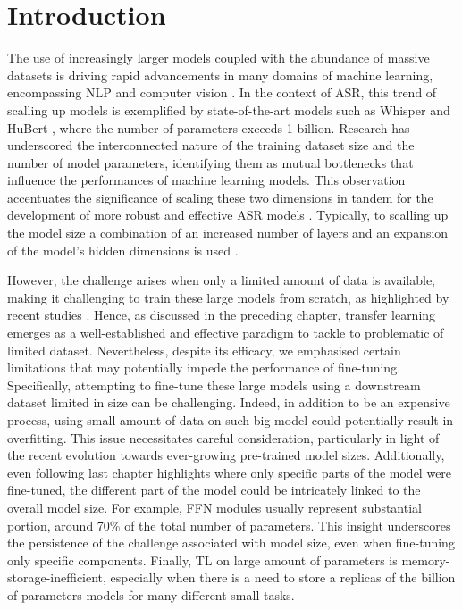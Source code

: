 \label{chap:Adapters_exp}
\cleardoublepage

\section{Introduction}
The use of increasingly larger models coupled with the abundance of massive datasets is driving rapid advancements in many domains of machine learning, encompassing NLP \cite{brown2020language} and computer vision \cite{ramesh2021zero}. In the context of ASR, this trend of scalling up models is exemplified by state-of-the-art models such as Whisper \cite{radford2023robust} and HuBert \cite{hsu2021hubert}, where the number of parameters exceeds 1 billion. Research has underscored the interconnected nature of the training dataset size and the number of model parameters, identifying them as mutual bottlenecks that influence the performances of machine learning models. This observation accentuates the significance of scaling these two dimensions in tandem for the development of more robust and effective ASR models \cite{Kaplan2020ScalingLF}. Typically, to scalling up the model size a combination of an increased number of layers and an expansion of the model's hidden dimensions is used \cite{zheng22d_interspeech}.

However, the challenge arises when only a limited amount of data is available, making it challenging to train these large models from scratch, as highlighted by recent studies \cite{sri_end2end, gelin2021endtoend}. Hence, as discussed in the preceding chapter, transfer learning emerges as a well-established and effective paradigm to tackle to problematic of limited dataset. Nevertheless, despite its efficacy, we emphasised certain limitations that may potentially impede the performance of fine-tuning. Specifically, attempting to fine-tune these large models using a downstream dataset limited in size can be challenging. Indeed, in addition to be an expensive process, using small amount of data on such big model could potentially result in overfitting. This issue necessitates careful consideration, particularly in light of the recent evolution towards ever-growing pre-trained model sizes. Additionally, even following last chapter highlights where only specific parts of the model were fine-tuned, the different part of the model could be intricately linked to the overall model size. For example, FFN modules usually represent substantial portion, around 70\% of the total number of parameters. This insight underscores the persistence of the challenge associated with model size, even when fine-tuning only specific components. Finally, TL on large amount of parameters is memory-storage-inefficient, especially when there is a need to store a replicas of the billion of parameters models for many different small tasks.

